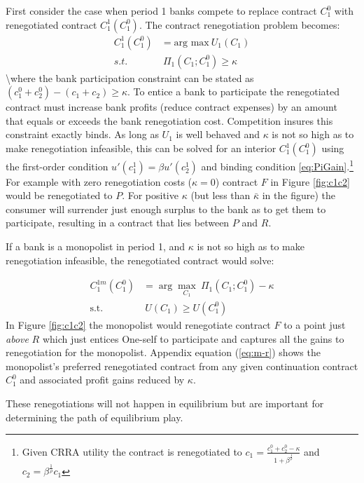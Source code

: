 \documentclass[11pt,english]{article}
\theoremstyle{plain}
\theoremstyle{definition}
\begin{document}
First consider the case when period 1 banks compete to replace contract
$C_{1}^{0}$ with renegotiated contract $C_{1}^{1}(C_{1}^{0})$. The
contract renegotiation problem becomes: 
\begin{align}
C_{1}^{1}(C_{1}^{0}) & =\text{arg max}\ U_{1}(C_{1})\\
s.t. & \ \Pi_{1}(C_{1};C_{1}^{0})\ge\kappa\label{eq:PiGain}
\end{align}
\textbackslash{}where the bank participation constraint can be stated
as $(c_{1}^{0}+c_{2}^{0})-(c_{1}+c_{2})\ge\kappa$. To entice a bank
to participate the renegotiated contract must increase bank profits
(reduce contract expenses) by an amount that equals or exceeds the
bank renegotiation cost. Competition insures this constraint exactly
binds. As long as $U_{1}$ is well behaved and $\kappa$ is not so
high as to make renegotiation infeasible, this can be solved for an
interior $C_{1}^{1}(C_{1}^{0})$ using the first-order condition $u'(c_{1}^{1})=\beta u'(c_{2}^{1})$
and binding condition \ref{eq:PiGain}.\footnote{Given CRRA utility the contract is renegotiated to $c_{1}=\frac{c_{1}^{0}+c_{2}^{0}-\kappa}{1+\beta^{\frac{1}{\rho}}}$
and $c_{2}=\beta^{\frac{1}{\rho}}c_{1}$ } For example with zero renegotiation costs ($\kappa=0$) contract
$F$ in Figure \ref{fig:c1c2} would be renegotiated to $P$. For
positive $\kappa$ (but less than $\bar{\kappa}$ in the figure) the
consumer will surrender just enough surplus to the bank as to get
them to participate, resulting in a contract that lies between $P$
and $R$.

If a bank is a monopolist in period 1, and $\kappa$ is not so high
as to make renegotiation infeasible, the renegotiated contract would
solve:

\begin{align}
C_{1}^{1m}(C_{1}^{0}) & =\arg\max_{C_{1}}\ \Pi_{1}(C_{1};C_{1}^{0})-\kappa\\
\text{s.t.} & \ U(C_{1})\geq U(C_{1}^{0})\label{eq:ugain}
\end{align}
In Figure \ref{fig:c1c2} the monopolist would renegotiate contract
$F$ to a point just \textit{above }$R$ which just entices One-self
to participate and captures all the gains to renegotiation for the
monopolist. Appendix equation (\ref{eq:m-r}) shows the monopolist's
preferred renegotiated contract from any given continuation contract
$C_{1}^{0}$ and associated profit gains reduced by $\kappa$.

These renegotiations will not happen in equilibrium but are important
for determining the path of equilibrium play.
\end{document}
